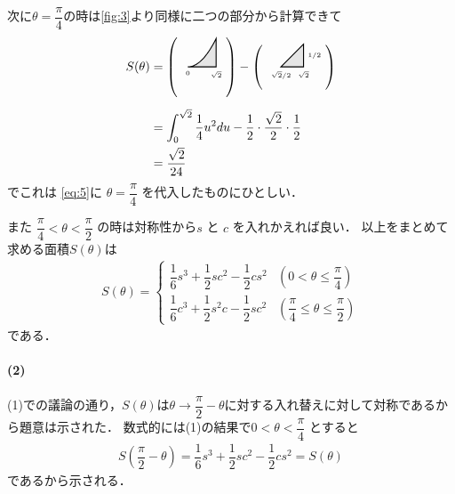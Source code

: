 \documentclass[../../main.tex]{subfiles}
\begin{document}
次に$\theta=\dfrac{\pi}{4}$の時は\cref{fig:3}より同様に二つの部分から計算できて
\begin{align}
  S(\theta) &=
  \left( \text{
      \begin{tikzpicture}[baseline={(0,-0.1)}, scale=0.8]
        \fill[gray!20] (0,0) -- plot[domain=0:1] (\x, {\x*\x}) -- (1,0) -- cycle;
        \draw[thick] (0,0) -- plot[domain=0:1] (\x, {\x*\x}) -- (1,0) -- cycle;
        \node[below, font=\tiny] at (0,0) {$0$};
        \node[below, font=\tiny] at (1,0) {$\sqrt{2}$};
  \end{tikzpicture}} \right)
  -
  \left( \text{
      \begin{tikzpicture}[baseline={(0,-0.1)}, scale=0.8]
        \fill[gray!20] (0,0) -- (0.8,0.8) -- (0.8,0) -- cycle;
        \draw[thick] (0,0) -- (0.8,0.8) -- (0.8,0) -- cycle;
        \node[below, font=\tiny] at (0,0) {$\sqrt{2}/2$};
        \node[below, font=\tiny] at (0.8,0) {$\sqrt{2}$};
        \node[right, font=\tiny] at (0.8,0.4) {$1/2$};
  \end{tikzpicture}} \right) \\[2mm]
  &=\int_0^{\sqrt{2}}\dfrac{1}{4}u^2du - \dfrac{1}{2}\cdot\dfrac{\sqrt{2}}{2}\cdot\dfrac{1}{2} \\
  &=\dfrac{\sqrt{2}}{24} \label{eq:6}
\end{align}
でこれは \cref{eq:5}に $\theta=\dfrac{\pi}{4}$ を代入したものにひとしい．

また $\dfrac{\pi}{4}<\theta<\dfrac{\pi}{2}$ の時は対称性から$s$ と $c$ を入れかえれば良い．
以上をまとめて求める面積$S(\theta)$は
\begin{align}
  S(\theta)=
  \begin{cases}
    \dfrac{1}{6}s^3+\dfrac{1}{2}sc^2-\dfrac{1}{2}cs^2 & \left(0<\theta\le\dfrac{\pi}{4}\right) \\[2mm]
    \dfrac{1}{6}c^3+\dfrac{1}{2}s^2c-\dfrac{1}{2}sc^2 & \left(\dfrac{\pi}{4}\le \theta\le\dfrac{\pi}{2}\right)
  \end{cases}
\end{align}
である．

\paragraph{(2)}
(1)での議論の通り，$S(\theta)$は$\theta \to \dfrac{\pi}{2}-\theta$に対する入れ替えに対して対称であるから題意は示された．
数式的には(1)の結果で$0<\theta<\dfrac{\pi}{4}$ とすると
\begin{align}
  S\left(\dfrac{\pi}{2}-\theta\right) = \dfrac{1}{6}s^3+\dfrac{1}{2}sc^2-\dfrac{1}{2}cs^2 = S(\theta)
\end{align}
であるから示される．

\newpage
\end{document}
